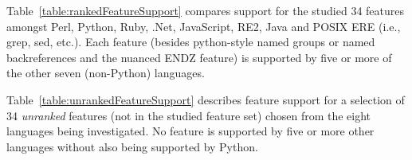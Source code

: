 \documentclass[12pt]{article}
\begin{document}

Table~\ref{table:rankedFeatureSupport} compares support for the studied 34 features amongst Perl, Python, Ruby, .Net, JavaScript, RE2, Java and POSIX ERE (i.e., grep, sed, etc.).  Each feature (besides python-style named groups or named backreferences and the nuanced ENDZ feature) is supported by five or more of the other seven (non-Python) languages.
\pagebreak


Table~\ref{table:unrankedFeatureSupport} describes feature support for a selection of 34 \emph{unranked} features (not in the studied feature set) chosen from the eight languages being investigated. No feature is supported by five or more other languages without also being supported by Python.
\end{document}
